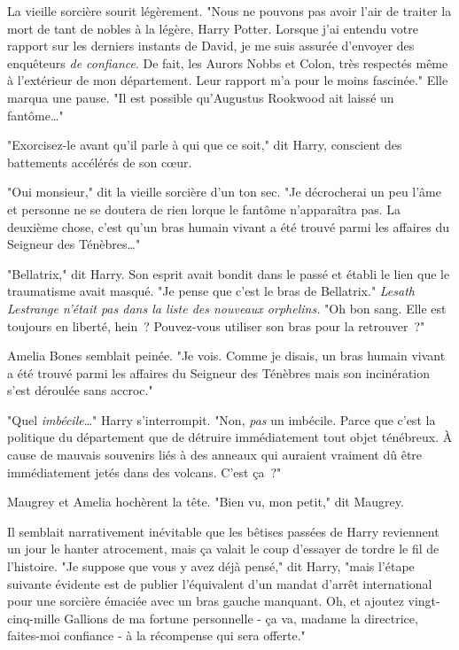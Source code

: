 La vieille sorcière sourit légèrement. "Nous ne pouvons pas avoir l'air de traiter la mort de tant de nobles à la légère, Harry Potter. Lorsque j'ai entendu votre rapport sur les derniers instants de David, je me suis assurée d'envoyer des enquêteurs \emph{de confiance}. De fait, les Aurors Nobbs et Colon, très respectés même à l'extérieur de mon département. Leur rapport m'a pour le moins fascinée." Elle marqua une pause. "Il est possible qu'Augustus Rookwood ait laissé un fantôme…"

"Exorcisez-le avant qu'il parle à qui que ce soit," dit Harry, conscient des battements accélérés de son cœur.

"Oui monsieur," dit la vieille sorcière d'un ton sec. "Je décrocherai un peu l'âme et personne ne se doutera de rien lorque le fantôme n'apparaîtra pas. La deuxième chose, c'est qu'un bras humain vivant a été trouvé parmi les affaires du Seigneur des Ténèbres…"

"Bellatrix," dit Harry. Son esprit avait bondit dans le passé et établi le lien que le traumatisme avait masqué. "Je pense que c'est le bras de Bellatrix." \emph{Lesath Lestrange n'était pas dans la liste des nouveaux orphelins.} "Oh bon sang. Elle est toujours en liberté, hein~? Pouvez-vous utiliser son bras pour la retrouver~?"

Amelia Bones semblait peinée. "Je vois. Comme je disais, un bras humain vivant a été trouvé parmi les affaires du Seigneur des Ténèbres mais son incinération s'est déroulée sans accroc."

"Quel \emph{imbécile}…" Harry s'interrompit. "Non, \emph{pas} un imbécile. Parce que c'est la politique du département que de détruire immédiatement tout objet ténébreux. À cause de mauvais souvenirs liés à des anneaux qui auraient vraiment dû être immédiatement jetés dans des volcans. C'est ça~?"

Maugrey et Amelia hochèrent la tête. "Bien vu, mon petit," dit Maugrey.

Il semblait narrativement inévitable que les bêtises passées de Harry reviennent un jour le hanter atrocement, mais ça valait le coup d'essayer de tordre le fil de l'histoire. "Je suppose que vous y avez déjà pensé," dit Harry, "mais l'étape suivante évidente est de publier l'équivalent d'un mandat d'arrêt international pour une sorcière émaciée avec un bras gauche manquant. Oh, et ajoutez vingt-cinq-mille Gallions de ma fortune personnelle - ça va, madame la directrice, faites-moi confiance - à la récompense qui sera offerte."

